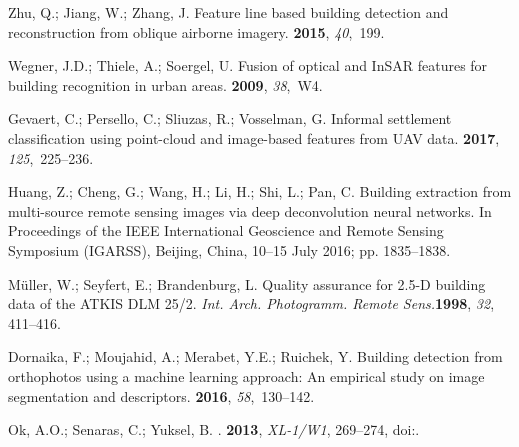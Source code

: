 \documentclass[remotesensing,article,accept,moreauthors,pdftex,10pt,a4paper]{mdpi}
\theoremstyle{mdpi}
\newcounter{ex}
\newcounter{re}
\begin{document}
\begin{thebibliography}{999}
Zhu, Q.; Jiang, W.; Zhang, J.
\newblock Feature line based building detection and reconstruction from oblique
  airborne imagery.
 {\bf 2015}, {\em 40},~199.

Wegner, J.D.; Thiele, A.; Soergel, U.
\newblock Fusion of optical and InSAR features for building recognition in
  urban areas.
 {\bf 2009}, {\em 38},~W4.

Gevaert, C.; Persello, C.; Sliuzas, R.; Vosselman, G.
\newblock Informal settlement classification using point-cloud and image-based
  features from UAV data.
 {\bf 2017},
  {\em 125},~225--236.
\newblock

Huang, Z.; Cheng, G.; Wang, H.; Li, H.; Shi, L.; Pan, C.
\newblock Building extraction from multi-source remote sensing images via deep
  deconvolution neural networks.
\newblock  In Proceedings of the IEEE International Geoscience and Remote Sensing Symposium
  (IGARSS), Beijing, China, 10--15 July 2016; pp. 1835--1838.

M{\"u}ller, W.; Seyfert, E.; Brandenburg, L.
\newblock Quality assurance for 2.5-D building data of the ATKIS DLM 25/2. \emph{Int. Arch. Photogramm. Remote Sens.}\textbf{1998}, \emph{32}, 411--416.

Dornaika, F.; Moujahid, A.; Merabet, Y.E.; Ruichek, Y.
\newblock Building detection from orthophotos using a machine learning
  approach: An empirical study on image segmentation and descriptors.
 {\bf 2016}, {\em 58},~130--142.
\newblock
  

{Ok}, A.O.; {Senaras}, C.; {Yuksel}, B.
.
 {\bf 2013}, \emph{XL-1/W1}, 269--274,
\newblock
  doi:{\href{https://doi.org/10.5194/isprsarchives-XL-1-W1-269-2013}{}}.


\end{thebibliography}
\end{document}
